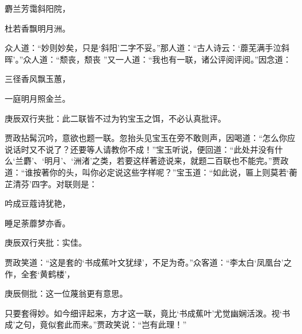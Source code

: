 \begin{poem}
    \begin{pl}    麝兰芳霭斜阳院，\end{pl}

    \begin{pl}    杜若香飘明月洲。\end{pl}
\end{poem}


\begin{parag}
    众人道：“妙则妙矣，只是‘斜阳’二字不妥。”那人道：“古人诗云：‘蘼芜满手泣斜晖’。”众人道：“颓丧，颓丧 ”又一人道：“我也有一联，诸公评阅评阅。”因念道：
\end{parag}


\begin{poem}
    \begin{pl}三径香风飘玉蕙，\end{pl}

    \begin{pl}一庭明月照金兰。\end{pl}
    \begin{note}庚辰双行夹批：此二联皆不过为钓宝玉之饵，不必认真批评。\end{note}
\end{poem}


\begin{parag}
    贾政拈髯沉吟，意欲也题一联。忽抬头见宝玉在旁不敢则声，因喝道：“怎么你应说话时又不说了？还要等人请教你不成！”宝玉听说，便回道：“此处并没有什么‘兰麝’、‘明月’、‘洲渚’之类，若要这样著迹说来，就题二百联也不能完。”贾政道：“谁按著你的头，叫你必定说这些字样呢？”宝玉道：“如此说，匾上则莫若‘蘅芷清芬’四字。对联则是：
\end{parag}


\begin{poem}
    \begin{pl}吟成豆蔻诗犹艳，\end{pl}
    \begin{pl}睡足荼蘼梦亦香。\end{pl}\begin{note}庚辰双行夹批：实佳。\end{note}
\end{poem}


\begin{parag}
    贾政笑道：“这是套的‘书成蕉叶文犹绿’，不足为奇。”众客道：“李太白‘凤凰台’之作，全套‘黄鹤楼’，\begin{note}庚辰侧批：这一位蔑翁更有意思。\end{note}只要套得妙。如今细评起来，方才这一联，竟比‘书成蕉叶’尤觉幽娴活泼。视‘书成’之句，竟似套此而来。”贾政笑说：“岂有此理！”
\end{parag}


